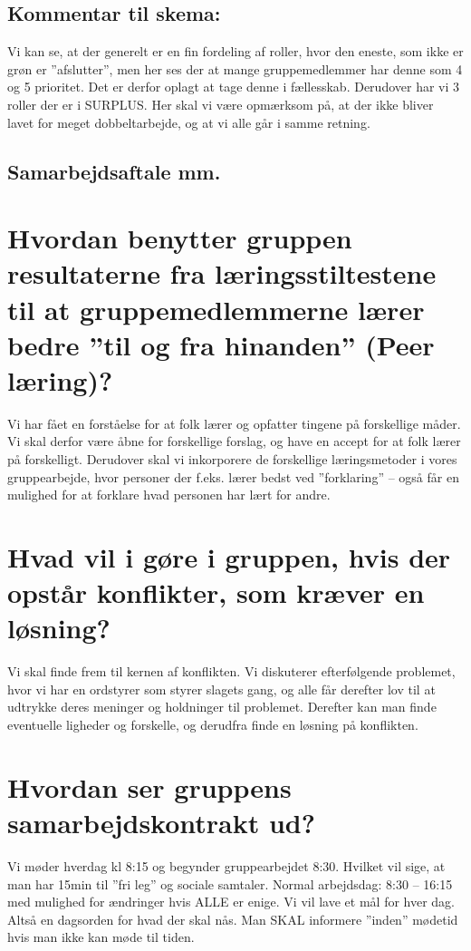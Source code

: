 \documentclass[oneside,a4paper,titlepage]{article}
\begin{document}
\subsection*{Kommentar til skema:}
Vi kan se, at der generelt er en fin fordeling af roller, hvor den eneste, som ikke er grøn er ”afslutter”, men her ses der at mange gruppemedlemmer har denne som 4 og 5 prioritet. Det er derfor oplagt at tage denne i fællesskab. Derudover har vi 3 roller der er i SURPLUS. Her skal vi være opmærksom på, at der ikke bliver lavet for meget dobbeltarbejde, og at vi alle går i samme retning.

\subsection{Samarbejdsaftale mm.}
\label{sec:samarbejdsaftale}

\section*{Hvordan benytter gruppen resultaterne fra læringsstiltestene til at gruppemedlemmerne lærer bedre ”til og fra hinanden” (Peer læring)?}
Vi har fået en forståelse for at folk lærer og opfatter tingene på forskellige måder. Vi skal derfor være åbne for forskellige forslag, og have en accept for at folk lærer på forskelligt. Derudover skal vi inkorporere de forskellige læringsmetoder i vores gruppearbejde, hvor personer der f.eks. lærer bedst ved ”forklaring” – også får en mulighed for at forklare hvad personen har lært for andre.
\section*{Hvad vil i gøre i gruppen, hvis der opstår konflikter, som kræver en løsning?}
Vi skal finde frem til kernen af konflikten. Vi diskuterer efterfølgende problemet, hvor vi har en ordstyrer som styrer slagets gang, og alle får derefter lov til at udtrykke deres meninger og holdninger til problemet. Derefter kan man finde eventuelle ligheder og forskelle, og derudfra finde en løsning på konflikten.
\section*{Hvordan ser gruppens samarbejdskontrakt ud?}
Vi møder hverdag kl 8:15 og begynder gruppearbejdet 8:30. Hvilket vil sige, at man har 15min til ”fri leg” og sociale samtaler.
Normal arbejdsdag: 8:30 – 16:15 med mulighed for ændringer hvis ALLE er enige.
Vi vil lave et mål for hver dag. Altså en dagsorden for hvad der skal nås.
Man SKAL informere ”inden” mødetid hvis man ikke kan møde til tiden.
\end{document}
